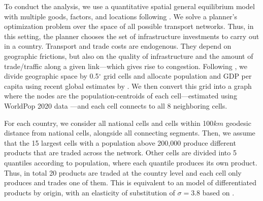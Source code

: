 \documentclass[a4paper]{article}
\begin{document}
To conduct the analysis, we use a quantitative spatial general equilibrium model with multiple goods, factors, and locations following \citet{fajgelbaum2020optimal}. 
We solve a planner's optimization problem over the space of all possible transport networks. Thus, in this setting, the planner chooses the set of infrastructure investments to carry out in a country. Transport and trade costs are endogenous. They depend on geographic frictions, but also on the quality of infrastructure and the amount of trade/traffic along a given link---which gives rise to congestion. Following \citet{fajgelbaum2020optimal}, we divide geographic space by 0.5$^\circ$ grid cells and allocate population and GDP per capita using recent global estimates by \citet{LGEAW}. We then convert this grid into a graph where the nodes are the population-centroids of each cell---estimated using WorldPop 2020 data \citep{tatem2017worldpop}---and each cell connects to all 8 neighboring cells. \newline %

For each country, we consider all national cells and cells within 100$km$ geodesic distance from national cells, alongside all connecting segments. Then, we assume that the 15 largest cells with a population above 200,000 produce different products that are traded across the network. Other cells are divided into 5 quantiles according to population, where each quantile produces its own product. Thus, in total 20 products are traded at the country level and each cell only produces and trades one of them. This is equivalent to an \citet{armington1969theory} model of differentiated products by origin, with an elasticity of substitution of $\sigma = 3.8$ based on \citet{BAJZIK2020103383}.  \newline
\end{document}
